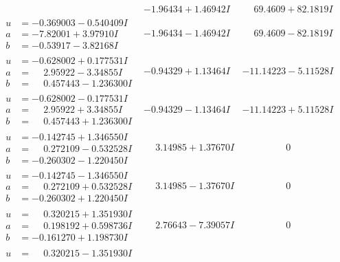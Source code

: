 \documentclass[1p]{elsarticle_modified}
\theoremstyle{definition}
\begin{document}
$$\begin{array}{c|c|c}
 & -1.96434 + 1.46942 I & \phantom{-}69.4609 + 82.1819 I \\ \hline\begin{aligned}
u &= -0.369003 - 0.540409 I \\
a &= -7.82001 + 3.97910 I \\
b &= -0.53917 - 3.82168 I\end{aligned}
 & -1.96434 - 1.46942 I & \phantom{-}69.4609 - 82.1819 I \\ \hline\begin{aligned}
u &= -0.628002 + 0.177531 I \\
a &= \phantom{-}2.95922 - 3.34855 I \\
b &= \phantom{-}0.457443 - 1.236300 I\end{aligned}
 & -0.94329 + 1.13464 I & -11.14223 - 5.11528 I \\ \hline\begin{aligned}
u &= -0.628002 - 0.177531 I \\
a &= \phantom{-}2.95922 + 3.34855 I \\
b &= \phantom{-}0.457443 + 1.236300 I\end{aligned}
 & -0.94329 - 1.13464 I & -11.14223 + 5.11528 I \\ \hline\begin{aligned}
u &= -0.142745 + 1.346550 I \\
a &= \phantom{-}0.272109 - 0.532528 I \\
b &= -0.260302 - 1.220450 I\end{aligned}
 & \phantom{-}3.14985 + 1.37670 I & \phantom{-0.000000 } 0 \\ \hline\begin{aligned}
u &= -0.142745 - 1.346550 I \\
a &= \phantom{-}0.272109 + 0.532528 I \\
b &= -0.260302 + 1.220450 I\end{aligned}
 & \phantom{-}3.14985 - 1.37670 I & \phantom{-0.000000 } 0 \\ \hline\begin{aligned}
u &= \phantom{-}0.320215 + 1.351930 I \\
a &= \phantom{-}0.198192 + 0.598736 I \\
b &= -0.161270 + 1.198730 I\end{aligned}
 & \phantom{-}2.76643 - 7.39057 I & \phantom{-0.000000 } 0 \\ \hline\begin{aligned}
u &= \phantom{-}0.320215 - 1.351930 I \\

\end{aligned}
\end{array}$$
\end{document}
